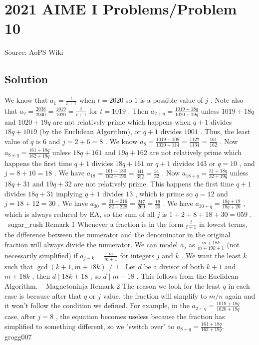 \documentclass[12pt]{article}
\begin{document}
\section*{{2021 AIME I Problems/Problem 10}}
Source: AoPS Wiki

\subsection*{Solution}
We know that $a_{1}=\tfrac{t}{t+1}$ when $t=2020$ so $1$ is a possible value of $j$ . Note also that $a_{2}=\tfrac{2038}{2040}=\tfrac{1019}{1020}=\tfrac{t}{t+1}$ for $t=1019$ . Then $a_{2+q}=\tfrac{1019+18q}{1020+19q}$ unless $1019+18q$ and $1020+19q$ are not relatively prime which happens when $q+1$ divides $18q+1019$ (by the Euclidean Algorithm), or $q+1$ divides $1001$ . Thus, the least value of $q$ is $6$ and $j=2+6=8$ . We know $a_{8}=\tfrac{1019+108}{1020+114}=\tfrac{1127}{1134}=\tfrac{161}{162}$ . Now $a_{8+q}=\tfrac{161+18q}{162+19q}$ unless $18q+161$ and $19q+162$ are not relatively prime which happens the first time $q+1$ divides $18q+161$ or $q+1$ divides $143$ or $q=10$ , and $j=8+10=18$ . We have $a_{18}=\tfrac{161+180}{162+190}=\tfrac{341}{352}=\tfrac{31}{32}$ . Now $a_{18+q}=\tfrac{31+18q}{32+19q}$ unless $18q+31$ and $19q+32$ are not relatively prime. This happens the first time $q+1$ divides $18q+31$ implying $q+1$ divides $13$ , which is prime so $q=12$ and $j=18+12=30$ . We have $a_{30}=\tfrac{31+216}{32+228}=\tfrac{247}{260}=\tfrac{19}{20}$ . We have $a_{30+q}=\tfrac{18q+19}{19q+20}$ , which is always reduced by EA, so the sum of all $j$ is $1+2+8+18+30=\boxed{059}$ . ~sugar_rush Remark 1 Whenever a fraction is in the form $\frac{t}{t+1}$ in lowest terms, the difference between the numerator and the denominator in the original fraction will always divide the numerator. We can model $a_j$ as $\frac{m+18k}{m+19k+1}$ (not necessarily simplified) if $a_{j-k}=\frac{m}{m+1}$ for integers $j$ and $k$ . We want the least $k$ such that $\gcd(k+1,{m+18k})\neq1$ . Let $d$ be a divisor of both $k+1$ and $m+18k$ , then $d\mid18k+18$ , so $d\mid{m-18}$ . This follows from the Euclidean Algorithm. ~ Magnetoninja Remark 2 The reason we look for the least $q$ in each case is because after that $q$ or $j$ value, the fraction will simplify to $m/n$ again and it won't follow the condition we defined. For example, in the $a_{2+q}=\tfrac{1019+18q}{1020+19q}$ case, after $j = 8$ , the equation becomes useless because the fraction has simplified to something different, so we "switch over" to $a_{8+q}=\tfrac{161+18q}{162+19q}.$ ~ grogg007
\end{document}
